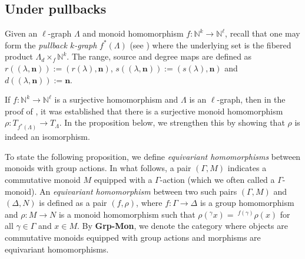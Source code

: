 \documentclass[a4paper,reqno,12pt]{amsart}
\numberwithin{equation}{section}
\theoremstyle{definition}
\theoremstyle{remark}
\newcommand{\N}{\mathbf{n}}
\begin{document}
\subsection{Under pullbacks}\label{ssec pullback} Given an $\ell$-graph $\Lambda$ and monoid homomorphism $f:\mathbb{N}^k\longrightarrow \mathbb{N}^\ell$, recall that one may form the \emph{pullback $k$-graph} $f^*(\Lambda)$ (see \cite[Definition 1.9]{KumjianPask}) where the underlying set is the fibered product $\Lambda {{}_{d}\times_{f}} \mathbb{N}^k$. The range, source and degree maps are defined as $r((\lambda,\N)):=(r(\lambda),\N)$, $s((\lambda,\N)):=(s(\lambda),\N)$ and $d((\lambda,\N)):=\N$.

If $f:\mathbb{N}^k\longrightarrow \mathbb{N}^\ell$ is a surjective homomorphism and $\Lambda$ is an $\ell$-graph, then in the proof of \cite[Proposition 4.8(ii)]{HMPS1}, it was established that there is a surjective monoid homomorphism $\rho:T_{f^*(\Lambda)}\longrightarrow T_\Lambda$. In the proposition below, we strengthen this by showing that $\rho$ is indeed an isomorphism.   

To state the following proposition, we define \emph{equivariant homomorphisms} between monoids with group actions. In what follows, a pair $(\Gamma,M)$ indicates a commutative monoid $M$ equipped with a $\Gamma$-action (which we often called a $\Gamma$-monoid). An \emph{equivariant homomorphism} between two such pairs $(\Gamma,M)$ and $(\Delta,N)$ is defined as a pair $(f,\rho)$, where $f:\Gamma\longrightarrow \Delta$ is a group homomorphism and $\rho:M\longrightarrow N$ is a monoid homomorphism such that $\rho(^\gamma x)=~^{f(\gamma)}\rho(x)$ for all $\gamma\in \Gamma$ and $x\in M$. By \textbf{Grp-Mon}, we denote the category where objects are commutative monoids equipped with group actions and morphisms are equivariant homomorphisms.     
\end{document}
